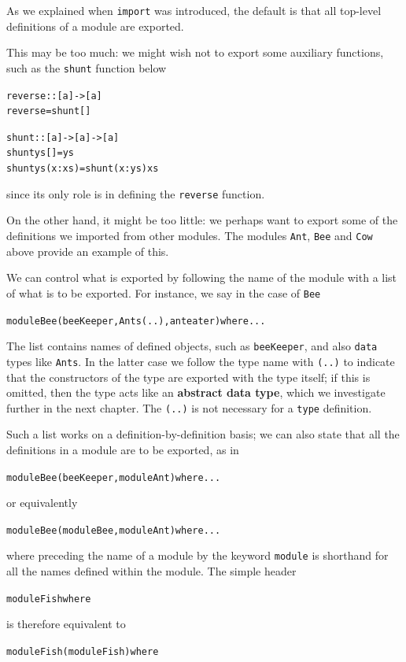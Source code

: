 As we explained when \texttt{import} was introduced,
the default is that all top-level definitions of a
module are exported. 
\begin{titemize}
\item This may be too much: we might wish not to export some
auxiliary functions, such as the \texttt{shunt} function below
\begin{alltt}
reverse :: [a] -> [a]
reverse = shunt []

shunt :: [a] -> [a] -> [a]
shunt ys []     = ys
shunt ys (x:xs) = shunt (x:ys) xs
\end{alltt}
since its only role is in defining the \texttt{reverse} function.
\item On the other hand, it might be too little: we perhaps want
to export some of the definitions we imported from other modules. The modules
\texttt{Ant}, \texttt{Bee} and \texttt{Cow} above provide an example of this.
\end{titemize}
We can control what is exported by following the name of the module with a
list of what is to be exported. For instance, we say in the case of \texttt{Bee}
\begin{alltt}
module Bee ( beeKeeper, Ants(..), anteater ) where ...
\end{alltt}
The list contains names of defined objects, such as \texttt{beeKeeper}, and also
\texttt{data} types like \texttt{Ants}.
In the latter case we follow the type name with \texttt{(..)} to indicate
that the constructors of the type are exported with the type
itself; if this is omitted, then the type acts like an \textbf{abstract
data type}, which we investigate further in the next chapter. The
\texttt{(..)} is
not necessary for a \texttt{type} definition.

Such a list works on a definition-by-definition basis; we can also state that
all the definitions in a module are to be exported, as in
\begin{alltt}
module Bee ( beeKeeper, module Ant ) where ...
\end{alltt}
or equivalently
\begin{alltt}
module Bee ( module Bee , module Ant ) where ...
\end{alltt}
where preceding the name of a module by the keyword \texttt{module} 
is shorthand for
all the names defined within the module. The simple header
\begin{alltt}
module Fish where
\end{alltt}
is therefore equivalent to 
\begin{alltt}
module Fish ( module Fish ) where
\end{alltt}


